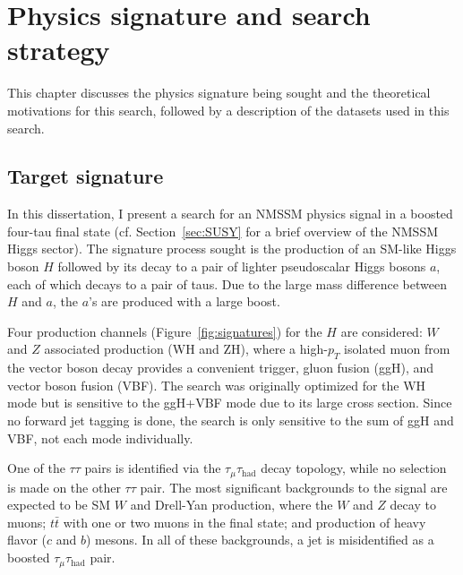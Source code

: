 \chapter{Physics signature and search strategy\label{sec:strategy}}

This chapter discusses the physics signature being sought and the theoretical motivations for this search, followed by a description of the datasets used in this search.

\section{Target signature\label{sec:signature}}

In this dissertation, I present a search for an NMSSM physics signal in a boosted four-tau final state (cf. Section~\ref{sec:SUSY} for a brief overview of the NMSSM Higgs sector). The signature process sought is the production of an SM-like Higgs boson $H$ followed by its decay to a pair of lighter pseudoscalar Higgs bosons $a$, each of which decays to a pair of taus. Due to the large mass difference between $H$ and $a$, the $a$'s are produced with a large boost.

Four production channels (Figure~\ref{fig:signatures}) for the $H$ are considered: $W$ and $Z$ associated production (WH and ZH), where a high-$p_T$ isolated muon from the vector boson decay provides a convenient trigger, gluon fusion (ggH), and vector boson fusion (VBF). The search was originally optimized for the WH mode but is sensitive to the ggH+VBF mode due to its large cross section. Since no forward jet tagging is done, the search is only sensitive to the sum of ggH and VBF, not each mode individually.

One of the $\tau\tau$ pairs is identified via the $\tau_{\mu}\tau_{\text{had}}$ decay topology, while no selection is made on the other $\tau\tau$ pair. The most significant backgrounds to the signal are expected to be SM $W$ and Drell-Yan production, where the $W$ and $Z$ decay to muons; $t\bar{t}$ with one or two muons in the final state; and production of heavy flavor ($c$ and $b$) mesons. In all of these backgrounds, a jet is misidentified as a boosted $\tau_{\mu}\tau_{\text{had}}$ pair.

